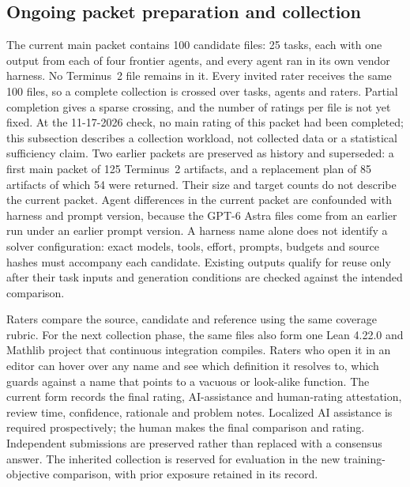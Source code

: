 \subsection{Ongoing packet preparation and collection}
The current main packet contains 100 candidate files: 25 tasks, each with one output from each of four frontier agents, and every agent ran in its own vendor harness.
No Terminus~2 file remains in it.
Every invited rater receives the same 100 files, so a complete collection is crossed over tasks, agents and raters.
Partial completion gives a sparse crossing, and the number of ratings per file is not yet fixed.
At the 11-17-2026 check, no main rating of this packet had been completed; this subsection describes a collection workload, not collected data or a statistical sufficiency claim.
Two earlier packets are preserved as history and superseded: a first main packet of 125 Terminus~2 artifacts, and a replacement plan of 85 artifacts of which 54 were returned.
Their size and target counts do not describe the current packet.
Agent differences in the current packet are confounded with harness and prompt version, because the GPT-6 Astra files come from an earlier run under an earlier prompt version.
A harness name alone does not identify a solver configuration: exact models, tools, effort, prompts, budgets and source hashes must accompany each candidate.
Existing outputs qualify for reuse only after their task inputs and generation conditions are checked against the intended comparison.

Raters compare the source, candidate and reference using the same coverage rubric.
For the next collection phase, the same files also form one Lean 4.22.0 and Mathlib project that continuous integration compiles.
Raters who open it in an editor can hover over any name and see which definition it resolves to, which guards against a name that points to a vacuous or look-alike function.
The current form records the final rating, AI-assistance and human-rating attestation, review time, confidence, rationale and problem notes.
Localized AI assistance is required prospectively; the human makes the final comparison and rating.
Independent submissions are preserved rather than replaced with a consensus answer.
The inherited collection is reserved for evaluation in the new training-objective comparison, with prior exposure retained in its record.

